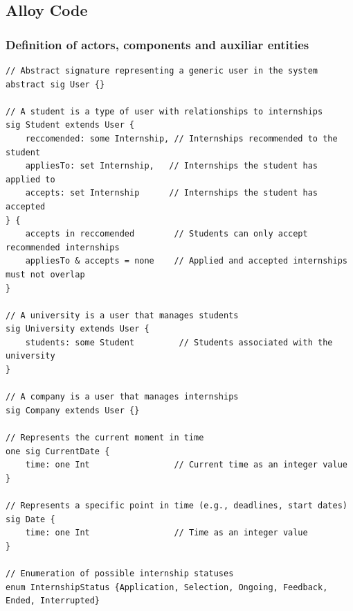 \documentclass[a4paper,12pt]{article}
\begin{document}
\subsection{Alloy Code}

\subsubsection{Definition of actors, components and auxiliar entities}
\begin{lstlisting}
// Abstract signature representing a generic user in the system
abstract sig User {}

// A student is a type of user with relationships to internships
sig Student extends User {
    reccomended: some Internship, // Internships recommended to the student
    appliesTo: set Internship,   // Internships the student has applied to
    accepts: set Internship      // Internships the student has accepted
} {
    accepts in reccomended        // Students can only accept recommended internships
    appliesTo & accepts = none    // Applied and accepted internships must not overlap
}

// A university is a user that manages students
sig University extends User {
    students: some Student         // Students associated with the university
}

// A company is a user that manages internships
sig Company extends User {}

// Represents the current moment in time
one sig CurrentDate {
    time: one Int                 // Current time as an integer value
}

// Represents a specific point in time (e.g., deadlines, start dates)
sig Date {
    time: one Int                 // Time as an integer value
}

// Enumeration of possible internship statuses
enum InternshipStatus {Application, Selection, Ongoing, Feedback, Ended, Interrupted}


\end{lstlisting}
\end{document}

